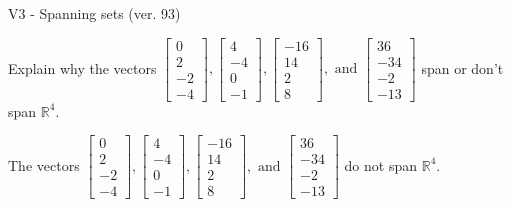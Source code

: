 \begin{exercise}
  \begin{exerciseTitle}V3 - Spanning sets (ver. 93)\end{exerciseTitle}
  \begin{exerciseStatement}
    Explain why the vectors \(\left[\begin{array}{r}
0 \\
2 \\
-2 \\
-4
\end{array}\right] , \left[\begin{array}{r}
4 \\
-4 \\
0 \\
-1
\end{array}\right] , \left[\begin{array}{r}
-16 \\
14 \\
2 \\
8
\end{array}\right] , \text{ and } \left[\begin{array}{r}
36 \\
-34 \\
-2 \\
-13
\end{array}\right]\) span or don't span \(\mathbb{R}^4\). 
	


  \end{exerciseStatement}
  \begin{exerciseAnswer}
   The vectors \(\left[\begin{array}{r}
0 \\
2 \\
-2 \\
-4
\end{array}\right] , \left[\begin{array}{r}
4 \\
-4 \\
0 \\
-1
\end{array}\right] , \left[\begin{array}{r}
-16 \\
14 \\
2 \\
8
\end{array}\right] , \text{ and } \left[\begin{array}{r}
36 \\
-34 \\
-2 \\
-13
\end{array}\right]\) 
  	 do not  
	span \(\mathbb{R}^4\).
  


  \end{exerciseAnswer}
\end{exercise}